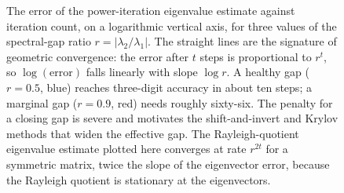 \begin{figure}[htbp]
\centering
{}
\caption[Geometric convergence of power iteration]{The error of the
power-iteration eigenvalue estimate against iteration count, on a
logarithmic vertical axis, for three values of the spectral-gap ratio
$r = \lvert\lambda_{2}/\lambda_{1}\rvert$. The straight lines are the
signature of geometric convergence: the error after $t$ steps is
proportional to $r^{t}$, so $\log(\text{error})$ falls linearly with
slope $\log r$. A healthy gap ($r = 0.5$, blue) reaches three-digit
accuracy in about ten steps; a marginal gap ($r = 0.9$, red) needs
roughly sixty-six. The penalty for a closing gap is severe and
motivates the shift-and-invert and Krylov methods that widen the
effective gap. The Rayleigh-quotient eigenvalue estimate plotted here
converges at rate $r^{2t}$ for a symmetric matrix, twice the slope of
the eigenvector error, because the Rayleigh quotient is stationary at
the eigenvectors.}
\label{fig:vol02:ch10:power-convergence}
\end{figure}
